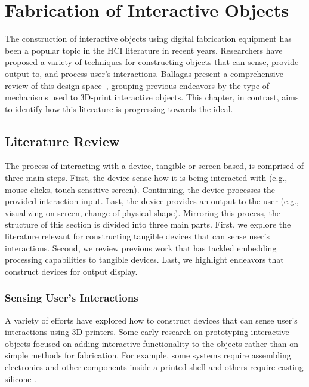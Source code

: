 \chapter{Fabrication of Interactive Objects} \label{ch:background}
  The construction of interactive objects using digital fabrication equipment
  has been a popular topic in the HCI literature in recent years. Researchers
  have proposed a variety of techniques for constructing objects that can sense,
  provide output to, and process user's interactions. Ballagas \etal present a
  comprehensive review of this design space~\cite{Ballagas:2018}, grouping
  previous endeavors by the type of mechanisms used to 3D-print interactive
  objects. This chapter, in contrast, aims to identify how this literature is
  progressing towards the \papf ideal.

  \section{\papf Literature Review}
    The process of interacting with a device, tangible or screen based, is
    comprised of three main steps. First, the device sense how it is being
    interacted with (e.g., mouse clicks, touch-sensitive screen). Continuing,
    the device processes the provided interaction input. Last, the device
    provides an output to the user (e.g., visualizing on screen, change of
    physical shape). Mirroring this process, the structure of this section is
    divided into three main parts. First, we explore the literature relevant for
    constructing tangible devices that can sense user's interactions. Second, we
    review previous work that has tackled embedding processing capabilities to
    tangible devices. Last, we highlight endeavors that construct devices for
    output display.

    \subsection{Sensing User's Interactions} \label{sec:sensing}
      A variety of efforts have explored how to construct devices that can sense
      user's interactions using 3D-printers. Some early research on prototyping
      interactive objects focused on adding interactive functionality to the
      objects rather than on simple methods for fabrication. For example, some
      systems require assembling electronics and other components inside a
      printed shell \cite{Savage:2015ws, Savage:2013, Murray-Smith:2008,
      Hook:2014kp} and others require casting silicone \cite{He:2017, Rod:2017}.

